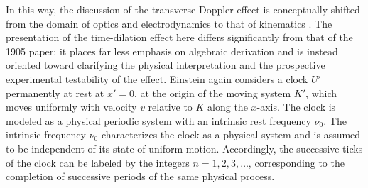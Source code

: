 \documentclass[submitted,12pt]{article}
\begin{document}

In this way, the discussion of the transverse Doppler effect is conceptually shifted from the domain of optics and electrodynamics to that of kinematics \citep[421\psq]{Einstein1908}. The presentation of the time-dilation effect here differs significantly from that of the 1905 paper: it places far less emphasis on algebraic derivation and is instead oriented toward clarifying the physical interpretation and the prospective experimental testability of the effect. Einstein again considers a clock $U'$ permanently at rest at $x'=0$, at the origin of the moving system $K'$, which moves uniformly with velocity $v$ relative to $K$ along the $x$-axis. The clock is modeled as a physical periodic system with an intrinsic rest frequency $\nu_0$. The intrinsic frequency $\nu_0$ characterizes the clock as a physical system and is assumed to be independent of its state of uniform motion. Accordingly, the successive ticks of the clock can be labeled by the integers $n=1,2,3,\ldots$, corresponding to the completion of successive periods of the same physical process.
\end{document}
